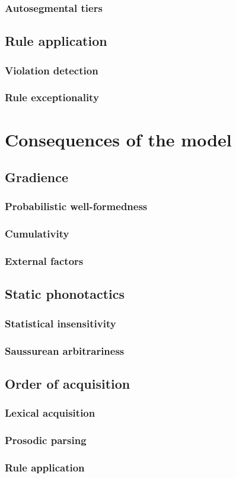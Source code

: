 \subsubsection{Autosegmental tiers}

\subsection{Rule application}
\subsubsection{Violation detection}
\subsubsection{Rule exceptionality}




\section{Consequences of the model}

\subsection{Gradience}
\subsubsection{Probabilistic well-formedness}
\subsubsection{Cumulativity}
\subsubsection{External factors}

\subsection{Static phonotactics}
\subsubsection{Statistical insensitivity}
\subsubsection{Saussurean arbitrariness}

\subsection{Order of acquisition}
\subsubsection{Lexical acquisition}
\subsubsection{Prosodic parsing}
\subsubsection{Rule application}

